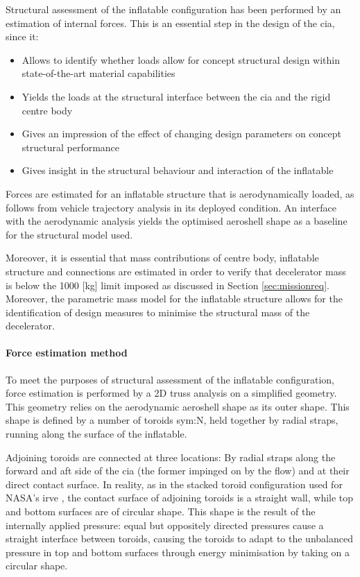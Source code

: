 Structural assessment of the inflatable configuration has been performed by an estimation of internal forces. This is an essential step in the design of the \gls{cia}, since it:
\begin{itemize}
\item Allows to identify whether loads allow for concept structural design within state-of-the-art material capabilities
\item Yields the loads at the structural interface between the \gls{cia} and the rigid centre body
\item Gives an impression of the effect of changing design parameters on concept structural performance
\item Gives insight in the structural behaviour and interaction of the inflatable
\end{itemize}
Forces are estimated for an inflatable structure that is aerodynamically loaded, as follows from vehicle trajectory analysis in its deployed condition. An interface with the aerodynamic analysis yields the optimised aeroshell shape as a baseline for the structural model used. 

Moreover, it is essential that mass contributions of centre body, inflatable structure and connections are estimated in order to verify that decelerator mass is below the 1000 [kg] limit imposed as discussed in Section \ref{sec:missionreq}. Moreover, the parametric mass model for the inflatable structure allows for the identification of design measures to minimise the structural mass of the decelerator.

\paragraph{Force estimation method}

To meet the purposes of structural assessment of the inflatable configuration, force estimation is performed by a 2D truss analysis on a simplified geometry. This geometry relies on the aerodynamic aeroshell shape as its outer shape. This shape is defined by a number of toroids \gls{sym:N}, held together by radial straps, running along the surface of the inflatable. 

Adjoining toroids are connected at three locations: By radial straps along the forward and aft side of the \gls{cia} (the former impinged on by the flow) and at their direct contact surface. In reality, as in the stacked toroid configuration used for NASA's \gls{irve} \cite{Lindell2006}, the contact surface of adjoining toroids is a straight wall, while top and bottom surfaces are of circular shape. This shape is the result of the internally applied pressure: equal but oppositely directed pressures cause a straight interface between toroids, causing the toroids to adapt to the unbalanced pressure in top and bottom surfaces through energy minimisation by taking on a circular shape.

